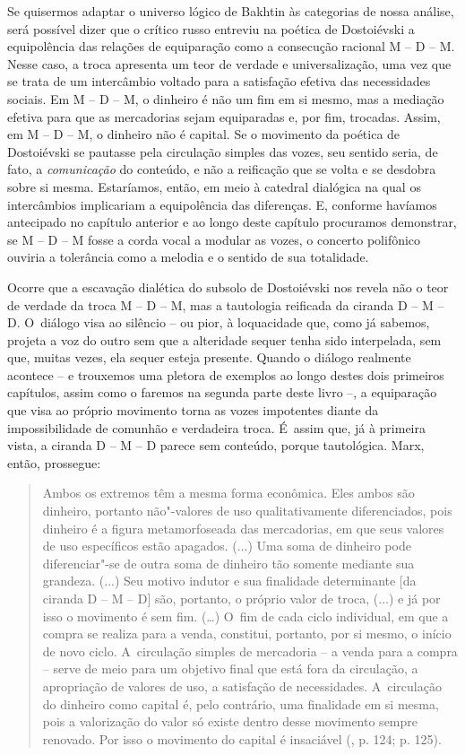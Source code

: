 {Se quisermos adaptar o universo lógico de Bakhtin às categorias de nossa
análise, será possível dizer que o crítico russo entreviu na poética de
Dostoiévski a equipolência das relações de equiparação como a consecução
racional M -- D -- M. Nesse caso, a troca apresenta um teor de verdade e
universalização, uma vez que se trata de um intercâmbio voltado para a
satisfação efetiva das necessidades sociais. Em M -- D -- M, o dinheiro
é não um fim em si mesmo, mas a mediação efetiva para que as mercadorias
sejam equiparadas e, por fim, trocadas. Assim, em M -- D -- M, o
dinheiro não é capital. Se o movimento da poética de Dostoiévski se
pautasse pela circulação simples das vozes, seu sentido seria, de fato,
a \emph{comunicação} do conteúdo, e não a reificação que se volta e se
desdobra sobre si mesma. Estaríamos, então, em meio à catedral dialógica
na qual os intercâmbios implicariam a equipolência das diferenças. E,
conforme havíamos antecipado no capítulo anterior e ao longo deste
capítulo procuramos demonstrar, se M -- D -- M fosse a corda vocal a
modular as vozes, o concerto polifônico ouviria a tolerância como a
melodia e o sentido de sua totalidade.

Ocorre que a escavação dialética do subsolo de Dostoiévski nos revela
não o teor de verdade da troca M -- D -- M, mas a tautologia reificada
da ciranda D -- M -- D. O~diálogo visa ao silêncio -- ou pior, à
loquacidade que, como já sabemos, projeta a voz do outro sem que a
alteridade sequer tenha sido interpelada, sem que, muitas vezes, ela
sequer esteja presente. Quando o diálogo realmente acontece -- e
trouxemos uma pletora de exemplos ao longo destes dois primeiros
capítulos, assim como o faremos na segunda parte deste livro --, a
equiparação que visa ao próprio movimento torna as vozes impotentes
diante da impossibilidade de comunhão e verdadeira troca. É~assim que,
já à primeira vista, a ciranda D -- M -- D parece sem conteúdo, porque
tautológica. Marx, então, prossegue:

\begin{quote}
Ambos os extremos têm a mesma forma econômica. Eles ambos são dinheiro,
portanto não"-valores de uso qualitativamente diferenciados, pois
dinheiro é a figura metamorfoseada das mercadorias, em que seus valores
de uso específicos estão apagados. (...) Uma soma de dinheiro pode
diferenciar"-se de outra soma de dinheiro tão somente mediante sua
grandeza. (...) Seu motivo indutor e sua finalidade determinante {[}da
ciranda D -- M -- D{]} são, portanto, o próprio valor de troca, (...) e
já por isso o movimento é sem fim. (\ldots{}) O~fim de cada ciclo
individual, em que a compra se realiza para a venda, constitui,
portanto, por si mesmo, o início de novo ciclo. A~circulação simples de
mercadoria -- a venda para a compra -- serve de meio para um objetivo
final que está fora da circulação, a apropriação de valores de uso, a
satisfação de necessidades. A~circulação do dinheiro como capital é,
pelo contrário, uma finalidade em si mesma, pois a valorização do valor
só existe dentro desse movimento sempre renovado. Por isso o movimento
do capital é insaciável (, p. 124; p. 125).
\end{quote}

}
